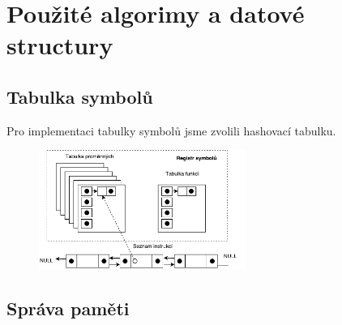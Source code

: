 \section{Použité algorimy a datové structury}
\subsection{Tabulka symbolů}
Pro implementaci tabulky symbolů jsme zvolili hashovací
tabulku.

\begin{figure}[htbp]
    \centering
    \includegraphics[width=0.6\textwidth, angle=0]{src/assets/symbol_table.pdf}
\end{figure}

\subsection{Správa paměti}
